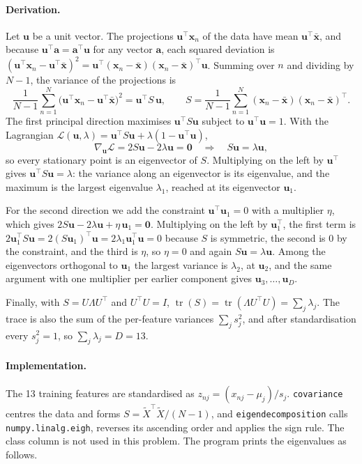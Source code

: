 \documentclass[11pt,a4paper]{article}
\newcommand{\T}{\top}
\newcommand{\x}{\mathbf{x}}
\newcommand{\uu}{\mathbf{u}}
\newcommand{\xbar}{\bar{\mathbf{x}}}
\newcommand{\tr}{\operatorname{tr}}
\begin{document}
\paragraph{Derivation.} Let $\uu$ be a unit vector. The projections $\uu^\T\x_n$ of the data
have mean $\uu^\T\xbar$, and because $\uu^\T\mathbf{a} = \mathbf{a}^\T\uu$ for any vector
$\mathbf a$, each squared deviation is
$(\uu^\T\x_n - \uu^\T\xbar)^2 = \uu^\T(\x_n - \xbar)(\x_n - \xbar)^\T\uu$. Summing over $n$ and
dividing by $N - 1$, the variance of the projections is
\[
  \frac{1}{N-1}\sum_{n=1}^{N}\bigl(\uu^\T\x_n - \uu^\T\xbar\bigr)^2 = \uu^\T S\,\uu,
  \qquad
  S = \frac{1}{N-1}\sum_{n=1}^{N}(\x_n - \xbar)(\x_n - \xbar)^\T .
\]
The first principal direction maximises $\uu^\T S\uu$ subject to $\uu^\T\uu = 1$. With the
Lagrangian $\mathcal L(\uu, \lambda) = \uu^\T S\uu + \lambda(1 - \uu^\T\uu)$,
\[
  \nabla_{\uu}\mathcal L = 2S\uu - 2\lambda\uu = \mathbf 0
  \quad\Longrightarrow\quad S\uu = \lambda\uu ,
\]
so every stationary point is an eigenvector of $S$. Multiplying on the left by $\uu^\T$ gives
$\uu^\T S\uu = \lambda$: the variance along an eigenvector is its eigenvalue, and the maximum is
the largest eigenvalue $\lambda_1$, reached at its eigenvector $\uu_1$.

For the second direction we add the constraint $\uu^\T\uu_1 = 0$ with a multiplier $\eta$, which
gives $2S\uu - 2\lambda\uu + \eta\,\uu_1 = \mathbf 0$. Multiplying on the left by $\uu_1^\T$, the
first term is $2\uu_1^\T S\uu = 2(S\uu_1)^\T\uu = 2\lambda_1\uu_1^\T\uu = 0$ because $S$ is
symmetric, the second is $0$ by the constraint, and the third is $\eta$, so $\eta = 0$ and again
$S\uu = \lambda\uu$. Among the eigenvectors orthogonal to $\uu_1$ the largest variance is
$\lambda_2$, at $\uu_2$, and the same argument with one multiplier per earlier component gives
$\uu_3, \dots, \uu_D$.

Finally, with $S = U\Lambda U^\T$ and $U^\T U = I$, $\tr(S) = \tr(\Lambda U^\T U) =
\sum_j\lambda_j$. The trace is also the sum of the per-feature variances $\sum_j s_j^2$, and
after standardisation every $s_j^2 = 1$, so $\sum_j\lambda_j = D = 13$.

\paragraph{Implementation.} The 13 training features are standardised as $z_{nj} =
(x_{nj} - \mu_j)/s_j$. \texttt{covariance} centres the data and forms
$S = \tilde X^\T\tilde X/(N - 1)$, and \texttt{eigendecomposition} calls
\texttt{numpy.linalg.eigh}, reverses its ascending order and applies the sign rule. The class
column is not used in this problem. The program prints the eigenvalues as follows.
\end{document}
